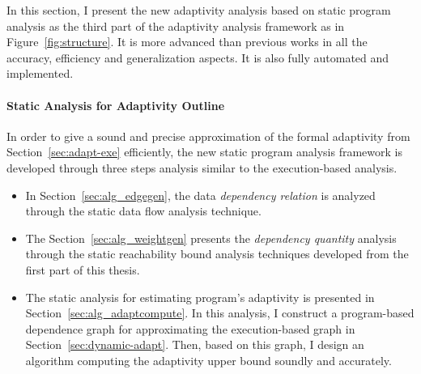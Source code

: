 In this section, I present the new 
adaptivity analysis based on static program analysis as the third part of 
the adaptivity analysis framework as in Figure~\ref{fig:structure}. 
It is more advanced than previous works in all the accuracy, efficiency and generalization aspects.
It is also fully automated and implemented.


\paragraph{{Static Analysis for Adaptivity Outline}}
%
In order to give a sound and precise approximation of the formal adaptivity from Section~\ref{sec:adapt-exe} efficiently, 
the new static program analysis framework is developed through three steps analysis
similar to the execution-based analysis.
\begin{itemize}
   \item In Section~\ref{sec:alg_edgegen},
   the data \emph{dependency relation} is analyzed through the static data flow analysis technique.
   \item The Section~\ref{sec:alg_weightgen} presents the \emph{dependency quantity} analysis through
   the static reachability bound analysis techniques developed from the first part of this thesis.
   \item The static analysis for estimating program's adaptivity is presented in Section~\ref{sec:alg_adaptcompute}.
   In this analysis, I construct a program-based dependence graph for approximating the execution-based graph in Section~\ref{sec:dynamic-adapt}.
   Then, based on this graph, I design an algorithm
   computing the adaptivity upper bound soundly 
   and accurately.
   \end{itemize}